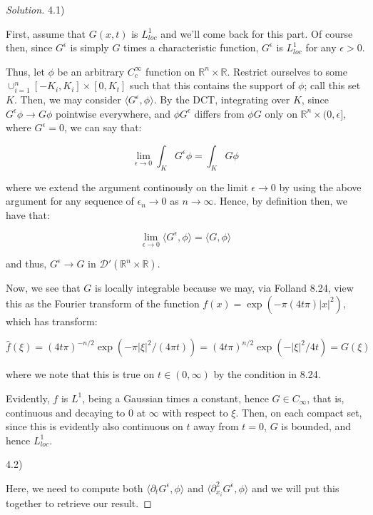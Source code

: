 \documentclass[10pt]{article}
\begin{document}
\begin{proof}[Solution]

4.1)

First, assume that $G(x,t)$ is $L^1_{loc}$ and we'll come back for this part. Of course then, since $G^\epsilon$ is simply $G$ times a characteristic function, $G^\epsilon$ is $L^1_{loc}$ for any $\epsilon > 0$.

Thus, let $\phi$ be an arbitrary $C^\infty_c$ function on $\mathbb{R}^n \times \mathbb{R}$. Restrict ourselves to some $\cup_{i=1}^n [-K_i, K_i] \times [0, K_t]$ such that this contains the support of $\phi$; call this set $K$. Then, we may consider $\langle G^\epsilon, \phi \rangle$. By the DCT, integrating over $K$, since $G^\epsilon \phi \to G \phi$ pointwise everywhere, and $\phi G^\epsilon$ differs from $\phi G$ only on $\mathbb{R}^n \times (0, \epsilon]$, where $G^\epsilon = 0$, we can say that:

$$ \lim_{\epsilon \to 0} \int_K G^\epsilon \phi = \int_K G \phi $$

where we extend the argument continously on the limit $\epsilon \to 0$ by using the above argument for any sequence of $\epsilon_n \to 0$ as $n \to \infty$. Hence, by definition then, we have that:

$$ \lim_{\epsilon \to 0} \langle G^\epsilon, \phi \rangle = \langle G, \phi \rangle $$

and thus, $G^\epsilon \to G$ in $\mathcal{D}'(\mathbb{R}^n \times \mathbb{R})$.

Now, we see that $G$ is locally integrable because we may, via Folland 8.24, view this as the Fourier transform of the function $f(x) = \exp(- \pi (4t \pi) |x|^2)$, which has transform:

$$ \hat{f}(\xi) = (4t\pi)^{-n/2} \exp(- \pi |\xi|^2/(4\pi t)) = (4 t \pi )^{n/2} \exp(-|\xi|^2/4t) = G(\xi) $$

where we note that this is true on $t \in (0, \infty)$ by the condition in 8.24.

Evidently, $f$ is $L^1$, being a Gaussian times a constant, hence $G \in C_\infty$, that is, continuous and decaying to 0 at $\infty$ with respect to $\xi$. Then, on each compact set, since this is evidently also continuous on $t$ away from $t = 0$, $G$ is bounded, and hence $L^1_{loc}$.

4.2)

Here, we need to compute both $\langle \partial_t G^\epsilon, \phi \rangle$ and $\langle \partial_{x_i}^2 G^\epsilon, \phi \rangle$ and we will put this together to retrieve our result.


\end{proof}
\end{document}
